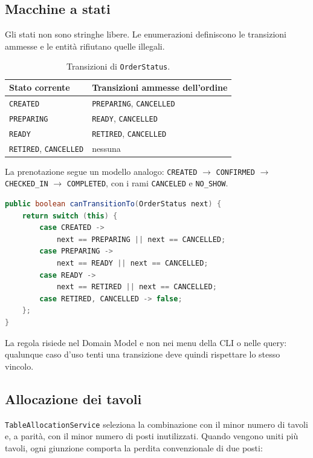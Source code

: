 \documentclass[12pt,a4paper]{article}
\newcommand{\code}[1]{\nolinkurl{#1}}
\begin{document}
\subsection{Macchine a stati}

Gli stati non sono stringhe libere. Le enumerazioni definiscono le transizioni
ammesse e le entità rifiutano quelle illegali.

\begin{table}[H]
\centering
\begin{tabular}{p{4cm}p{10cm}}
\toprule
\textbf{Stato corrente} & \textbf{Transizioni ammesse dell'ordine} \\
\midrule
\code{CREATED} & \code{PREPARING}, \code{CANCELLED} \\
\code{PREPARING} & \code{READY}, \code{CANCELLED} \\
\code{READY} & \code{RETIRED}, \code{CANCELLED} \\
\code{RETIRED}, \code{CANCELLED} & nessuna \\
\bottomrule
\end{tabular}
\caption{Transizioni di \code{OrderStatus}.}
\end{table}

La prenotazione segue un modello analogo:
\code{CREATED} $\rightarrow$ \code{CONFIRMED} $\rightarrow$
\code{CHECKED\_IN} $\rightarrow$ \code{COMPLETED}, con i rami
\code{CANCELED} e \code{NO\_SHOW}.

\begin{lstlisting}[style=codeStyle,language=Java,
caption={Regole di transizione incapsulate nell'enumerazione.}]
public boolean canTransitionTo(OrderStatus next) {
    return switch (this) {
        case CREATED ->
            next == PREPARING || next == CANCELLED;
        case PREPARING ->
            next == READY || next == CANCELLED;
        case READY ->
            next == RETIRED || next == CANCELLED;
        case RETIRED, CANCELLED -> false;
    };
}
\end{lstlisting}

La regola risiede nel Domain Model e non nei menu della CLI o nelle query:
qualunque caso d'uso tenti una transizione deve quindi rispettare lo stesso
vincolo.

\subsection{Allocazione dei tavoli}

\code{TableAllocationService} seleziona la combinazione con il minor numero di
tavoli e, a parità, con il minor numero di posti inutilizzati. Quando vengono
uniti più tavoli, ogni giunzione comporta la perdita convenzionale di due posti:
\end{document}
